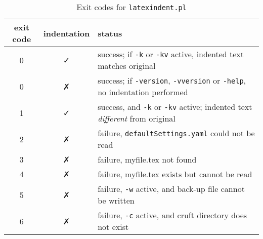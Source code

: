 	\begin{table}[!htb]
		\caption{Exit codes for \texttt{latexindent.pl}}
		\label{tab:exit-codes}
		\begin{tabular}{ccl}
			\toprule
			exit code & indentation & status                                                                                        \\
			\midrule
			0         & \faCheck    & success; if \texttt{-k} or \texttt{-kv} active, indented text matches original                \\
			0         & \faClose    & success; if \texttt{-version}, \texttt{-vversion} or \texttt{-help}, no indentation performed \\
			1         & \faCheck    & success, and \texttt{-k} or \texttt{-kv} active; indented text \emph{different} from original \\
			\midrule
			2         & \faClose    & failure, \texttt{defaultSettings.yaml} could not be read                                      \\
			3         & \faClose    & failure, myfile.tex not found                                                                 \\
			4         & \faClose    & failure, myfile.tex exists but cannot be read                                                 \\
			5         & \faClose    & failure, \texttt{-w} active, and back-up file cannot be written                               \\
			6         & \faClose    & failure, \texttt{-c} active, and cruft directory does not exist                               \\
			\bottomrule
		\end{tabular}
	\end{table}
